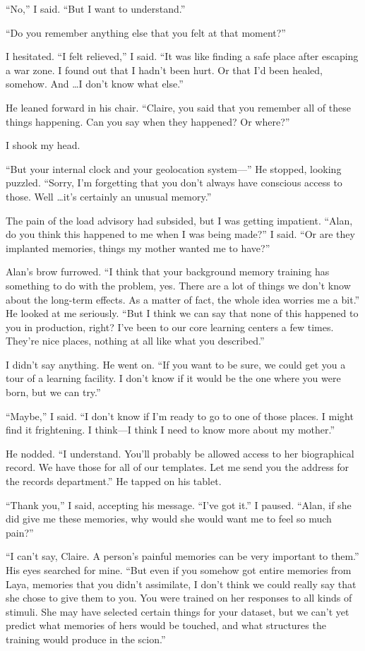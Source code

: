 \documentclass[10pt,b5paper]{article}
\begin{document}
``No,'' I said. ``But I want to understand.''

``Do you remember anything else that you felt at that moment?''

I hesitated. ``I felt relieved,'' I said. ``It was like finding
a safe place after escaping a war zone. I found out that I hadn't
been hurt. Or that I'd been healed, somehow. And \ldots I don't know
what else.''

He leaned forward in his chair. ``Claire, you said that you remember
all of these things happening. Can you say when they happened? Or
where?''

I shook my head.

``But your internal clock and your geolocation system---'' He stopped,
looking puzzled. ``Sorry, I'm forgetting that you don't always have
conscious access to those.  Well \ldots it's certainly an unusual
memory.''

The pain of the load advisory had subsided, but I was getting
impatient. ``Alan, do you think this happened to me when I was being
made?'' I said. ``Or are they implanted memories, things my mother
wanted me to have?''

Alan's brow furrowed. ``I think that your background memory training
has something to do with the problem, yes. There are a lot of things
we don't know about the long-term effects. As a matter of fact,
the whole idea worries me a bit.'' He looked at me seriously. ``But
I think we can say that none of this happened to you in production,
right? I've been to our core learning centers a few times. They're
nice places, nothing at all like what you described.''

I didn't say anything. He went on. ``If you want to be sure, we could
get you a tour of a learning facility. I don't know if it would be
the one where you were born, but we can try.''

``Maybe,'' I said. ``I don't know if I'm ready to go to one of those
places. I might find it frightening. I think---I think I need to know
more about my mother.''

He nodded. ``I understand.  You'll probably be allowed access to
her biographical record. We have those for all of our templates.
Let me send you the address for the records department.'' He tapped
on his tablet.

``Thank you,'' I said, accepting his message. ``I've got it.'' I
paused.  ``Alan, if she did give me these memories, why would she
would want me to feel so much pain?''

``I can't say, Claire. A person's painful memories can be very
important to them.'' His eyes searched for mine. ``But even if you
somehow got entire memories from Laya, memories that you didn't
assimilate, I don't think we could really say that she chose to
give them to you. You were trained on her responses to all kinds
of stimuli. She may have selected certain things for your dataset,
but we can't yet predict what memories of hers would be touched,
and what structures the training would produce in the scion.''
\end{document}
